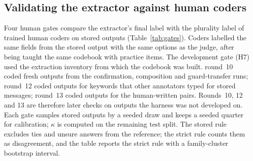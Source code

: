 \subsection{Validating the extractor against human coders}\label{sec:m-gates}

Four human gates compare the extractor's final label with the plurality label of trained human coders on stored outputs (Table~\ref{tab:gates}).
Coders labelled the same fields from the stored output with the same options as the judge, after being taught the same codebook with practice items.
The development gate (H7) used the extraction inventory from which the codebook was built.
round~10 coded fresh outputs from the confirmation, composition and guard-transfer runs; round~12 coded outputs for keywords that other annotators typed for stored messages; round~13 coded outputs for the human-written pairs.
Rounds~10, 12 and 13 are therefore later checks on outputs the harness was not developed on.
Each gate samples stored outputs by a seeded draw and keeps a seeded quarter for calibration; $\kappa$ is computed on the remaining test split.
The stored rule excludes ties and unsure answers from the reference; the strict rule counts them as disagreement, and the table reports the strict rule with a family-cluster bootstrap interval.

